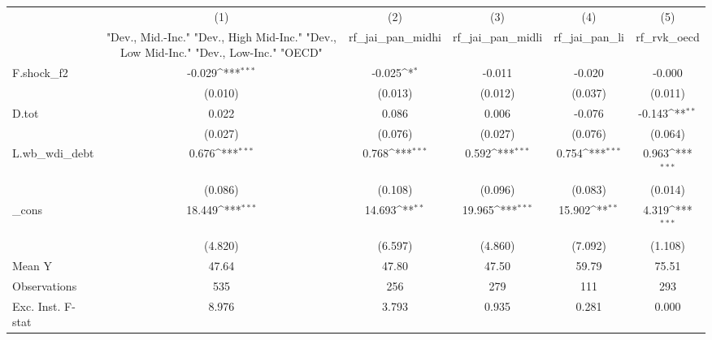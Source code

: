 {
\def\sym#1{\ifmmode^{#1}\else\(^{#1}\)\fi}
\begin{tabular}{l*{5}{c}}
\toprule
            &\multicolumn{1}{c}{(1)}&\multicolumn{1}{c}{(2)}&\multicolumn{1}{c}{(3)}&\multicolumn{1}{c}{(4)}&\multicolumn{1}{c}{(5)}\\
            &\multicolumn{1}{c}{ "Dev., Mid.-Inc." "Dev., High Mid-Inc." "Dev., Low Mid-Inc." "Dev., Low-Inc." "OECD" }&\multicolumn{1}{c}{rf\_jai\_pan\_midhi}&\multicolumn{1}{c}{rf\_jai\_pan\_midli}&\multicolumn{1}{c}{rf\_jai\_pan\_li}&\multicolumn{1}{c}{rf\_rvk\_oecd}\\
\midrule
F.shock\_f2  &      -0.029\sym{***}&      -0.025\sym{*}  &      -0.011         &      -0.020         &      -0.000         \\
            &     (0.010)         &     (0.013)         &     (0.012)         &     (0.037)         &     (0.011)         \\
\addlinespace
D.tot       &       0.022         &       0.086         &       0.006         &      -0.076         &      -0.143\sym{**} \\
            &     (0.027)         &     (0.076)         &     (0.027)         &     (0.076)         &     (0.064)         \\
\addlinespace
L.wb\_wdi\_debt&       0.676\sym{***}&       0.768\sym{***}&       0.592\sym{***}&       0.754\sym{***}&       0.963\sym{***}\\
            &     (0.086)         &     (0.108)         &     (0.096)         &     (0.083)         &     (0.014)         \\
\addlinespace
\_cons      &      18.449\sym{***}&      14.693\sym{**} &      19.965\sym{***}&      15.902\sym{**} &       4.319\sym{***}\\
            &     (4.820)         &     (6.597)         &     (4.860)         &     (7.092)         &     (1.108)         \\
\midrule
Mean Y      &       47.64         &       47.80         &       47.50         &       59.79         &       75.51         \\
Observations&         535         &         256         &         279         &         111         &         293         \\
Exc. Inst. F-stat&       8.976         &       3.793         &       0.935         &       0.281         &       0.000         \\
\bottomrule
\end{tabular}
}
